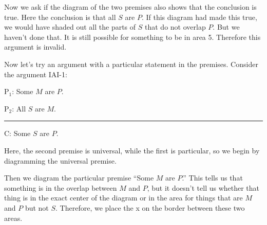 Now we ask if the diagram of the two premises also shows that the conclusion is true. Here the conclusion is that all $S$ are $P$. If this diagram had made this true, we would have shaded out all the parts of $S$ that do not overlap $P$. But we haven't done that. It is still possible for something to be in area 5. Therefore this argument is invalid. 

Now let's try an argument with a particular statement in the premises. Consider the argument IAI-1:

\begin{earg}
\item[P$_1$:] Some $M$ are $P$.
\item[P$_2$:] All $S$ are $M$.
\vspace{-.5em}
\item [] \rule{0.2\linewidth}{.5pt} 
\item[C:] Some $S$ are $P$.
\end{earg} 

Here, the second premise is universal, while the first is particular, so we begin by diagramming the universal premise.

\begin{center}
\end{center}

Then we diagram the particular premise ``Some $M$ are $P$.'' This tells us that something is in the overlap between $M$ and $P$, but it doesn't tell us whether that thing is in the exact center of the diagram or in the area for things that are $M$ and $P$ but not $S$. Therefore, we place the x on the border between these two areas.

\begin{center}
\end{center}

